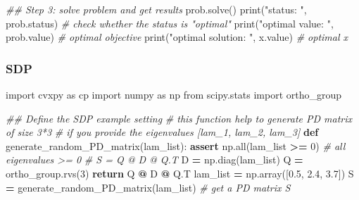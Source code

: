 \documentclass[
]{book}
\newenvironment{Shaded}{\begin{snugshade}}{\end{snugshade}}
\newcommand{\BuiltInTok}[1]{#1}
\newcommand{\CommentTok}[1]{\textcolor[rgb]{0.56,0.35,0.01}{\textit{#1}}}
\newcommand{\ControlFlowTok}[1]{\textcolor[rgb]{0.13,0.29,0.53}{\textbf{#1}}}
\newcommand{\DecValTok}[1]{\textcolor[rgb]{0.00,0.00,0.81}{#1}}
\newcommand{\FloatTok}[1]{\textcolor[rgb]{0.00,0.00,0.81}{#1}}
\newcommand{\ImportTok}[1]{#1}
\newcommand{\KeywordTok}[1]{\textcolor[rgb]{0.13,0.29,0.53}{\textbf{#1}}}
\newcommand{\NormalTok}[1]{#1}
\newcommand{\OperatorTok}[1]{\textcolor[rgb]{0.81,0.36,0.00}{\textbf{#1}}}
\newcommand{\StringTok}[1]{\textcolor[rgb]{0.31,0.60,0.02}{#1}}
\theoremstyle{definition}
\theoremstyle{definition}
\theoremstyle{definition}
\theoremstyle{definition}
\theoremstyle{remark}
\begin{document}
\begin{Shaded}
\begin{Highlighting}[]
\CommentTok{\#\# Step 3: solve problem and get results}
\NormalTok{prob.solve()  }
\BuiltInTok{print}\NormalTok{(}\StringTok{"status: "}\NormalTok{, prob.status) }\CommentTok{\# check whether the status is "optimal"}
\BuiltInTok{print}\NormalTok{(}\StringTok{"optimal value: "}\NormalTok{, prob.value) }\CommentTok{\# optimal objective}
\BuiltInTok{print}\NormalTok{(}\StringTok{"optimal solution: "}\NormalTok{, x.value) }\CommentTok{\# optimal x}
\end{Highlighting}
\end{Shaded}

\subsubsection{SDP}\label{sdp}

\begin{Shaded}
\begin{Highlighting}[]
\ImportTok{import}\NormalTok{ cvxpy }\ImportTok{as}\NormalTok{ cp}
\ImportTok{import}\NormalTok{ numpy }\ImportTok{as}\NormalTok{ np}
\ImportTok{from}\NormalTok{ scipy.stats }\ImportTok{import}\NormalTok{ ortho\_group}

\CommentTok{\#\# Define the SDP example setting}
\CommentTok{\# this function help to generate PD matrix of size 3*3 }
\CommentTok{\# if you provide the eigenvalues [lam\_1, lam\_2, lam\_3]}
\KeywordTok{def}\NormalTok{ generate\_random\_PD\_matrix(lam\_list):}
    \ControlFlowTok{assert}\NormalTok{ np.}\BuiltInTok{all}\NormalTok{(lam\_list }\OperatorTok{\textgreater{}=} \DecValTok{0}\NormalTok{) }\CommentTok{\# all eigenvalues \textgreater{}= 0}
    \CommentTok{\# S = Q @ D @ Q.T}
\NormalTok{    D }\OperatorTok{=}\NormalTok{ np.diag(lam\_list)}
\NormalTok{    Q }\OperatorTok{=}\NormalTok{ ortho\_group.rvs(}\DecValTok{3}\NormalTok{)}
    \ControlFlowTok{return}\NormalTok{ Q }\OperatorTok{@}\NormalTok{ D }\OperatorTok{@}\NormalTok{ Q.T}
\NormalTok{lam\_list }\OperatorTok{=}\NormalTok{ np.array([}\FloatTok{0.5}\NormalTok{, }\FloatTok{2.4}\NormalTok{, }\FloatTok{3.7}\NormalTok{])}
\NormalTok{S }\OperatorTok{=}\NormalTok{ generate\_random\_PD\_matrix(lam\_list) }\CommentTok{\# get a PD matrix S}


\end{Highlighting}
\end{Shaded}
\end{document}
